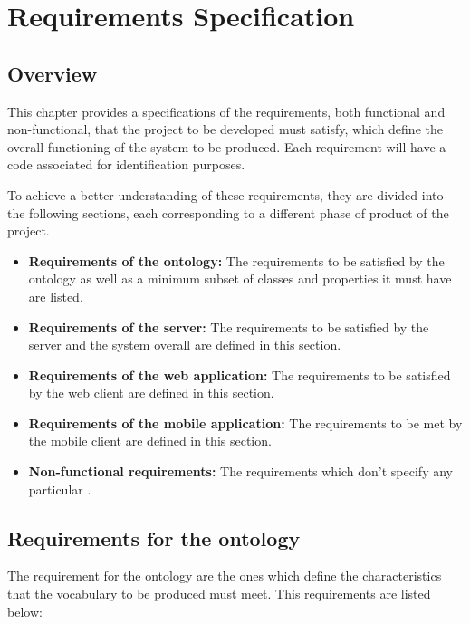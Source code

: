 \chapter{Requirements Specification}\label{ch:requirements}

\section{Overview}

This chapter provides a specifications of the requirements, both functional and non-functional, that the project to be developed must satisfy, which define the overall functioning of the system to be produced. Each requirement will have a code associated for identification purposes.

To achieve a better understanding of these requirements, they are divided into the following sections, each corresponding to a different phase of product of the project.

\begin{itemize}
\item \textbf{Requirements of the ontology:} The requirements to be satisfied by the ontology as well as a minimum subset of classes and properties it must have are listed.
\item \textbf{Requirements of the server:} The requirements to be satisfied by the server and the system overall are defined in this section.
\item \textbf{Requirements of the web application:} The requirements to be satisfied by the web client are defined in this section.
\item \textbf{Requirements of the mobile application:} The requirements to be met by the mobile client are defined in this section.
\item \textbf{Non-functional requirements:} The requirements which don't specify any particular .
\end{itemize}

\section{Requirements for the ontology}

The requirement for the ontology are the ones which define the characteristics that the vocabulary to be produced must meet. This requirements are listed below:

